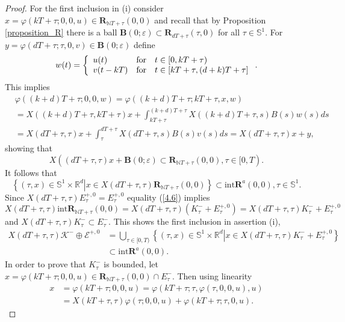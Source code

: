\documentclass{siamltex}%
\begin{document}
\begin{proof}
For the first inclusion in (i) consider $x=\varphi(kT+\tau;0,0,u)\in
\mathbf{R}_{\mathbb{N}T+\tau}(0,0)$ and recall that by Proposition
\ref{proposition_R} there is a ball $\mathbf{B}(0;\varepsilon)\subset
\mathbf{R}_{dT+\tau}(\tau,0)$ for all $\tau\in\mathbb{S}^{1}$. For
$y=\varphi(dT+\tau;\tau,0,v)\in\mathbf{B}(0;\varepsilon)$ define%
\[
w(t)=\left\{
\begin{array}
[c]{lll}%
u(t) & \text{for} & t\in\lbrack0,kT+\tau)\\
v(t-kT) & \text{for} & t\in\lbrack kT+\tau,(d+k)T+\tau]
\end{array}
\right.  .
\]
This implies%
\begin{align*}
&  \varphi((k+d)T+\tau;0,0,w)=\varphi((k+d)T+\tau;kT+\tau,x,w)\\
&  =X((k+d)T+\tau,kT+\tau)x+\int_{kT+\tau}^{(k+d)T+\tau}X((k+d)T+\tau
,s)B(s)w(s)ds\\
&  =X(dT+\tau,\tau)x+\int_{\tau}^{dT+\tau}X(dT+\tau,s)B(s)v(s)ds=X(dT+\tau
,\tau)x+y,
\end{align*}
showing that%
\[
X((dT+\tau,\tau)x+\mathbf{B}(0;\varepsilon)\subset\mathbf{R}_{\mathbb{N}%
T+\tau}(0,0),\tau\in\lbrack0,T).
\]
It follows that%
\[
\left\{  (\tau,x)\in\mathbb{S}^{1}\times\mathbb{R}^{d}\left\vert x\in
X(dT+\tau,\tau)\mathbf{R}_{\mathbb{N}T+\tau}(0,0)\right.  \right\}
\subset\mathrm{int}\mathbf{R}^{a}(0,0),\tau\in\mathbb{S}^{1}.
\]
Since $X(dT+\tau,\tau)E_{\tau}^{+,0}=E_{\tau}^{+,0}$ equality (\ref{4.6})
implies%
\[
X(dT+\tau,\tau)\mathrm{int}\mathbf{R}_{\mathbb{N}T+\tau}(0,0)=X(dT+\tau
,\tau)(K_{\tau}^{-}+E_{\tau}^{+,0})=X(dT+\tau,\tau)K_{\tau}^{-}+E_{\tau}^{+,0}%
\]
and $X(dT+\tau,\tau)K_{\tau}^{-}\subset E_{\tau}^{-}$. This shows the first
inclusion in assertion (i),%
\begin{align*}
X(dT+\tau,\tau)\mathcal{K}^{-}\oplus\mathcal{E}^{+,0}  &  =\bigcup
\nolimits_{\tau\in\lbrack0,T)}\left\{  (\tau,x)\in\mathbb{S}^{1}%
\times\mathbb{R}^{d}\left\vert x\in X(dT+\tau,\tau)K_{\tau}^{-}+E_{\tau}%
^{+,0}\right.  \right\} \\
&  \subset\mathrm{int}\mathbf{R}^{a}(0,0).
\end{align*}
In order to prove that $K_{\tau}^{-}$ is bounded, let $x=\varphi
(kT+\tau;0,0,u)\in\mathbf{R}_{\mathbb{N}T+\tau}(0,0)\cap E_{\tau}^{-}$. Then
using linearity%
\begin{align}
x  &  =\varphi(kT+\tau;0,0,u)=\varphi(kT+\tau;\tau,\varphi(\tau
,0,0,u),u)\label{B0}\\
&  =X(kT+\tau,\tau)\varphi(\tau;0,0,u)+\varphi(kT+\tau;\tau,0,u).\nonumber
\end{align}

\end{proof}
\end{document}
